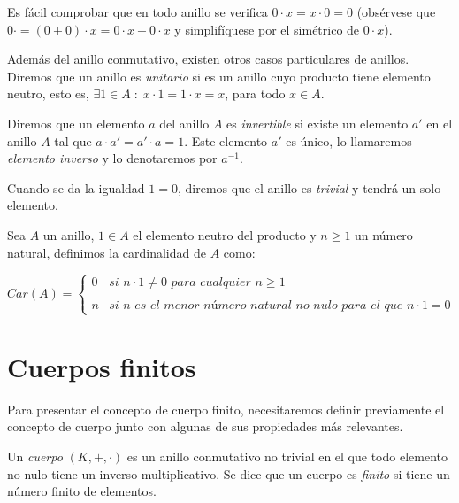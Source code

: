 Es fácil comprobar que en todo anillo se verifica $0 \cdot x = x \cdot 0 = 0$ (obsérvese que $0 \cdot = (0 + 0) \cdot x = 0 \cdot x + 0 \cdot x$ y simplifíquese por el simétrico de $0 \cdot x$).

Además del anillo conmutativo, existen otros casos particulares de anillos. Diremos que un anillo es \emph{unitario} si es un anillo cuyo producto tiene elemento neutro, esto es, $\exists 1 \in A \; : \; x \cdot 1 = 1 \cdot x = x$, para todo $x \in A$.

Diremos que un elemento $a$ del anillo $A$ es \emph{invertible} si existe un elemento $a'$ en el anillo $A$ tal que $a \cdot a' = a' \cdot a = 1$. Este elemento $a'$ es único, lo llamaremos \emph{elemento inverso} y lo denotaremos por $a^{-1}$.

Cuando se da la igualdad $1 = 0$, diremos que el anillo es \emph{trivial} y tendrá un solo elemento.

\begin{definition}
    Sea $A$ un anillo, $1 \in A$ el elemento neutro del producto y $n \geq 1$ un número natural, definimos la cardinalidad de $A$ como:

    \[
        Car(A) = \left\{ \begin{array}{lc}
        0 &   \textit{si } n \cdot 1 \neq 0 \textit{ para cualquier } n \geq 1 \\
        \\ n & \textit{si n es el menor número natural no nulo para el que } n \cdot 1 = 0
        \end{array}
        \right.
    \]
\end{definition}


\section{Cuerpos finitos}

Para presentar el concepto de cuerpo finito, necesitaremos definir previamente el concepto de cuerpo junto con algunas de sus propiedades más relevantes.

\begin{definition}
    Un \emph{cuerpo} $(K, +, \cdot)$ es un anillo conmutativo no trivial en el que todo elemento no nulo tiene un inverso multiplicativo. Se dice que un cuerpo es \emph{finito} si tiene un número finito de elementos.
\end{definition}

